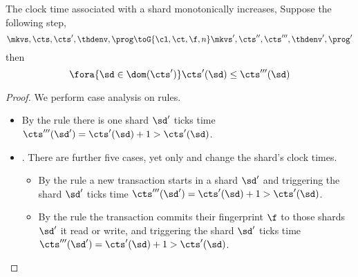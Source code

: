 \begin{lemma}
    \label{lem:mono-shard-clock-time}
    The clock time associated with a shard monotonically increases,
    Suppose the following step,
    \[
        \mkvs,\cts,\cts',\thdenv, \prog \toG{\cl,\ct,\f,n} \mkvs',\cts'',\cts''',\thdenv', \prog'
    \]
    then 
    \[
        \fora{\sd \in \dom(\cts')} \cts'(\sd) \leq \cts'''(\sd)
    \]
\end{lemma}
\begin{proof}
    We perform case analysis on rules.
    \begin{itemize}
        \item {}
            By the rule there is one shard \( \sd' \) ticks time \( \cts'''(\sd') = \cts'(\sd) + 1 > \cts'(\sd) \).
        \item {}.
            There are further five cases, yet only  and  change the shard's clock times.
            \begin{itemize}
                \item {}
                    By the rule a new transaction starts in a shard \( \sd' \) and triggering the shard \( \sd' \) ticks time \( \cts'''(\sd') = \cts'(\sd) + 1 > \cts'(\sd) \).
                \item {}
                    By the rule the transaction commits their fingerprint \( \f \) to those shards \( \sd' \) it read or write, and triggering the shard \( \sd' \) ticks time \( \cts'''(\sd') = \cts'(\sd) + 1 > \cts'(\sd) \).
            \end{itemize}
    \end{itemize}
\end{proof}


\begin{definition}
\end{definition}
